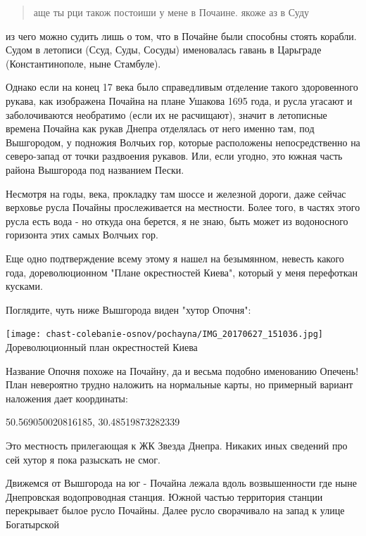 \begin{quotation}
аще ты рци також постоиши у мене в Почаине. якоже аз в Суду
\end{quotation}

из чего можно судить лишь о том, что в Почайне были способны стоять корабли. Судом в летописи (Ссуд, Суды, Сосуды) именовалась гавань в Царьграде (Константинополе, ныне Стамбуле).

Однако если на конец 17 века было справедливым отделение такого здоровенного рукава, как изображена Почайна на плане Ушакова 1695 года, и русла угасают и заболочиваются необратимо (если их не расчищают), значит в летописные времена Почайна как рукав Днепра отделялась от него именно там, под Вышгородом, у подножия Волчьих гор, которые расположены непосредственно на северо-запад от точки раздвоения рукавов. Или, если угодно, это южная часть района Вышгорода под названием Пески.

Несмотря на годы, века, прокладку там шоссе и железной дороги, даже сейчас верховье русла Почайны прослеживается на местности. Более того, в частях этого русла есть вода - но откуда она берется, я не знаю, быть может из водоносного горизонта этих самых Волчьих гор.

Еще одно подтверждение всему этому я нашел на безымянном, невесть какого года, дореволюционном "Плане окрестностей Киева", который у меня перефоткан кусками.

Поглядите, чуть ниже Вышгорода виден "хутор Опочня":

\begin{center}
\texttt{[image: chast-colebanie-osnov/pochayna/IMG\_20170627\_151036.jpg]}\\

Дореволюционный план окрестностей Киева
\end{center}

Название Опочня похоже на Почайну, да и весьма подобно именованию Опечень! План невероятно трудно наложить на нормальные карты, но примерный вариант наложения дает координаты:

50.569050020816185, 30.48519873282339

Это местность прилегающая к ЖК Звезда Днепра. Никаких иных сведений про сей хутор я пока разыскать не смог.

Движемся от Вышгорода на юг - Почайна лежала вдоль возвышенности где ныне Днепровская водопроводная станция. Южной частью территория станции перекрывает былое русло Почайны. Далее русло сворачивало на запад к улице Богатырской

